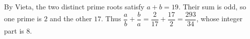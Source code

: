 By Vieta, the two distinct prime roots satisfy $a+b=19$. Their sum is odd, so one prime is $2$ and the other $17$. Thus $\dfrac{a}{b}+\dfrac{b}{a}=\dfrac{2}{17}+\dfrac{17}{2}=\dfrac{293}{34}$, whose integer part is $\boxed8$.
